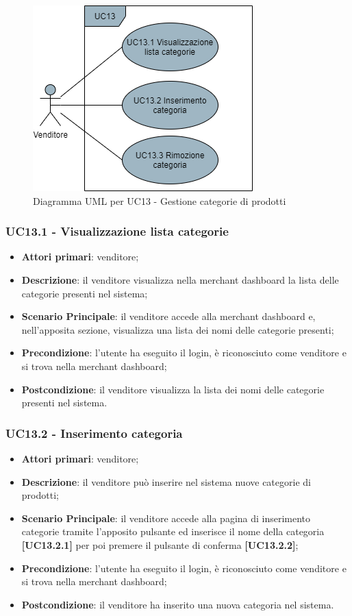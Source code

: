 \begin{figure}[H]
\centering
\includegraphics[scale=0.6]{res/UseCase/Immagini/GestioneCategorie}
\caption{Diagramma UML per UC13 - Gestione categorie di prodotti}
\end{figure}

\subsubsection{UC13.1 - Visualizzazione lista categorie}
\begin{itemize}
\item \textbf{Attori primari}: venditore;
\item \textbf{Descrizione}: il venditore visualizza nella merchant dashboard la lista delle categorie presenti nel sistema;
\item \textbf{Scenario Principale}: il venditore accede alla merchant dashboard e, nell'apposita sezione, visualizza una lista dei nomi delle categorie presenti;
\item \textbf{Precondizione}: l'utente ha eseguito il login, è riconosciuto come venditore e si trova nella merchant dashboard;
\item \textbf{Postcondizione}: il venditore visualizza la lista dei nomi delle categorie presenti nel sistema.
\end{itemize}

\subsubsection{UC13.2 - Inserimento categoria}
\begin{itemize}
\item \textbf{Attori primari}: venditore;
\item \textbf{Descrizione}: il venditore può inserire nel sistema nuove categorie di prodotti;
\item \textbf{Scenario Principale}: il venditore accede alla pagina di inserimento categorie tramite l'apposito pulsante ed inserisce il nome della categoria \textbf{[UC13.2.1]} per poi premere il pulsante di conferma \textbf{[UC13.2.2]};
\item \textbf{Precondizione}: l'utente ha eseguito il login, è riconosciuto come venditore e si trova nella merchant dashboard;
\item \textbf{Postcondizione}: il venditore ha inserito una nuova categoria nel sistema.
\end{itemize}


